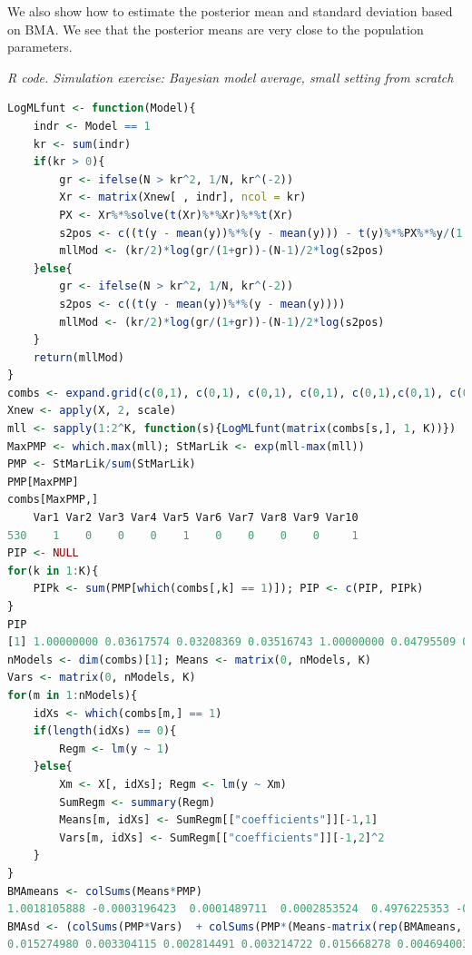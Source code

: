 We also show how to estimate the posterior mean and standard deviation based on BMA. We see that the posterior means are very close to the population parameters.  

\begin{tcolorbox}[enhanced,width=4.67in,center upper,
	fontupper=\large\bfseries,drop shadow southwest,sharp corners]
	\textit{R code. Simulation exercise: Bayesian model average, small setting from scratch}
	\begin{VF}
		\begin{lstlisting}[language=R]
LogMLfunt <- function(Model){
	indr <- Model == 1
	kr <- sum(indr)
	if(kr > 0){
		gr <- ifelse(N > kr^2, 1/N, kr^(-2))
		Xr <- matrix(Xnew[ , indr], ncol = kr)
		PX <- Xr%*%solve(t(Xr)%*%Xr)%*%t(Xr)
		s2pos <- c((t(y - mean(y))%*%(y - mean(y))) - t(y)%*%PX%*%y/(1 + gr))
		mllMod <- (kr/2)*log(gr/(1+gr))-(N-1)/2*log(s2pos)
	}else{
		gr <- ifelse(N > kr^2, 1/N, kr^(-2))
		s2pos <- c((t(y - mean(y))%*%(y - mean(y))))
		mllMod <- (kr/2)*log(gr/(1+gr))-(N-1)/2*log(s2pos)
	}
	return(mllMod)
}
combs <- expand.grid(c(0,1), c(0,1), c(0,1), c(0,1), c(0,1),c(0,1), c(0,1), c(0,1), c(0,1), c(0,1))
Xnew <- apply(X, 2, scale)
mll <- sapply(1:2^K, function(s){LogMLfunt(matrix(combs[s,], 1, K))})
MaxPMP <- which.max(mll); StMarLik <- exp(mll-max(mll))
PMP <- StMarLik/sum(StMarLik)
PMP[MaxPMP]
combs[MaxPMP,]
    Var1 Var2 Var3 Var4 Var5 Var6 Var7 Var8 Var9 Var10
530    1    0    0    0    1    0    0    0    0     1
PIP <- NULL
for(k in 1:K){
	PIPk <- sum(PMP[which(combs[,k] == 1)]); PIP <- c(PIP, PIPk)
}
PIP
[1] 1.00000000 0.03617574 0.03208369 0.03516743 1.00000000 0.04795509 0.03457102 0.03468819 0.03510209 1.00000000
nModels <- dim(combs)[1]; Means <- matrix(0, nModels, K)
Vars <- matrix(0, nModels, K)
for(m in 1:nModels){
	idXs <- which(combs[m,] == 1)
	if(length(idXs) == 0){
		Regm <- lm(y ~ 1)
	}else{
		Xm <- X[, idXs]; Regm <- lm(y ~ Xm)
		SumRegm <- summary(Regm)
		Means[m, idXs] <- SumRegm[["coefficients"]][-1,1]
		Vars[m, idXs] <- SumRegm[["coefficients"]][-1,2]^2 
	}
}
BMAmeans <- colSums(Means*PMP)
1.0018105888 -0.0003196423  0.0001489711  0.0002853524  0.4976225353 -0.0007229563  0.0005342718  0.0005441905  0.0005758708 -0.7035206822
BMAsd <- (colSums(PMP*Vars)  + colSums(PMP*(Means-matrix(rep(BMAmeans, each = nModels), nModels, K))^2))^0.5
0.015274980 0.003304115 0.002814491 0.003214722 0.015668278 0.004694003 0.006400541 0.006435695 0.006528471 0.030940753 
\end{lstlisting}
	\end{VF}
\end{tcolorbox} 

